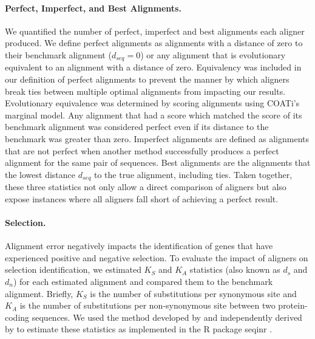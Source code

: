 \documentclass[12pt,letterpaper]{article}
\newcommand{\cyan}[1]{\textcolor{cyan}{#1}}
\begin{document}
\paragraph{Perfect, Imperfect, and Best Alignments.}
We quantified the number of perfect, imperfect and best alignments each aligner produced. We define perfect alignments as alignments with a distance of zero to their benchmark alignment ($d_{seq} = 0$) or any alignment that is evolutionary equivalent to an alignment with a distance of zero. Equivalency was included in our definition of perfect alignments to prevent the manner by which aligners break ties between multiple optimal alignments from impacting our results. Evolutionary equivalence was determined by scoring alignments using COATi's marginal model. Any alignment that had a score which matched the score of its benchmark alignment was considered perfect even if its distance to the benchmark was greater than zero.
%
Imperfect alignments are defined as alignments that are not perfect when another method successfully produces a perfect alignment for the same pair of sequences.
%
Best alignments are the alignments that the lowest distance $d_{seq}$ to the true alignment, including ties.
%
Taken together, these three statistics not only allow a direct comparison of aligners but also expose instances where all aligners fall short of achieving a perfect result.



\paragraph{Selection.}
Alignment error negatively impacts the identification of genes that have experienced positive and negative selection. To evaluate the impact of aligners on selection identification, we estimated $K_S$ and $K_A$ statistics (also known as $d_s$ and $d_n$) for each estimated alignment and compared them to the benchmark alignment. Briefly, $K_S$ is the number of substitutions per synonymous site and $K_A$ is the number of substitutions per non-synonymous site between two protein-coding sequences. We used the method developed by \cite{ka_ks_li_1993} and independently derived by \cite{Pamilo1993} to estimate these statistics as implemented in the R package seqinr \citep{seqinr}. 
\end{document}
